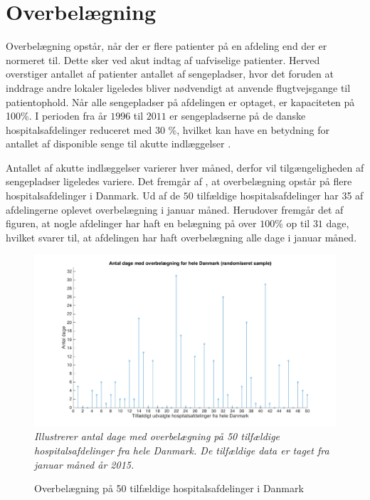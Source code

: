 \section{Overbelægning}\label{sec:overbelaegning}

Overbelægning opstår, når der er flere patienter på en afdeling end der er normeret til\cite{Heidmann2014}. Dette sker ved akut indtag af uafviselige patienter. Herved overstiger antallet af patienter antallet af sengepladser, hvor det foruden at inddrage andre lokaler ligeledes bliver nødvendigt at anvende flugtvejsgange til patientophold\cite{Beredskab2016}. Når alle sengepladser på afdelingen er optaget, er kapaciteten på 100\%. I perioden fra år $1996$ til $2011$ er sengepladserne på de danske hospitalsafdelinger reduceret med $30$ \%, hvilket kan have en betydning for antallet af disponible senge til akutte indlæggelser \cite{Madsen2014}. 

Antallet af akutte indlæggelser varierer hver måned, derfor vil tilgængeligheden af sengepladser ligeledes variere. Det fremgår af , at overbelægning opstår på flere hospitalsafdelinger i Danmark. Ud af de $50$ tilfældige hospitalsafdelinger har 35 af afdelingerne oplevet overbelægning i januar måned. Herudover fremgår det af figuren, at nogle afdelinger har haft en belægning på over $100$\% op til $31$ dage, hvilket svarer til, at afdelingen har haft overbelægning alle dage i januar måned.\cite{SDS2015}


\begin{figure}[H]
	\flushleft 
	\caption{Overbelægning på 50 tilfældige hospitalsafdelinger i Danmark}
	\centering
	\includegraphics[scale=.3]{figures/overbelaegning_ran}
	\label{ig:overbelaegning_ran}
	\flushleft
	\textit{Illustrerer antal dage med overbelægning på 50 tilfældige hospitalsafdelinger fra hele Danmark. De tilfældige data er taget fra januar måned år 2015. \cite{SDS2015}}
\end{figure}



